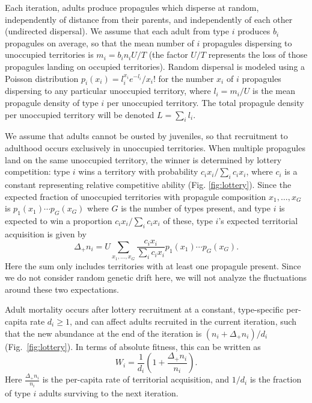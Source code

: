 \documentclass[12pt]{article}
\begin{document}
Each iteration, adults produce propagules which disperse at random, independently of distance from their parents, and independently of each other (undirected dispersal). We assume that each adult from type $i$ produces $b_i$ propagules on average, so that the mean number of $i$ propagules dispersing to unoccupied territories is $m_i=b_in_iU/T$ (the factor $U/T$ represents the loss of those propagules landing on occupied territories). Random dispersal is modeled using a Poisson distribution $p_i(x_i)=l_i^{x_i} e^{-l_i}/x_i!$ for the number $x_i$ of $i$ propagules dispersing to any particular unoccupied territory, where $l_i=m_i/U$ is the mean propagule density of type $i$ per unoccupied territory. The total propagule density per unoccupied territory will be denoted $L=\sum_i l_i$.

We assume that adults cannot be ousted by juveniles, so that recruitment to adulthood occurs exclusively in unoccupied territories. When multiple propagules land on the same unoccupied territory, the winner is determined by lottery competition: type $i$ wins a territory with probability $c_i x_i/\sum_i c_i x_i$, where $c_i$ is a constant representing relative competitive ability (Fig. \ref{fig:lottery}). Since the expected fraction of unoccupied territories with propagule composition $x_1,\ldots,x_G$ is $p_1(x_1)\cdots p_G(x_G)$ where $G$ is the number of types present, and type $i$ is expected to win a proportion $c_i x_i/\sum_i c_i x_i$ of these, type $i$'s expected territorial acquisition is given by
\begin{equation}
\Delta_+ n_i=U\sum_{x_1,\ldots,x_G} \frac{c_i x_i}{\sum_i c_i x_i} p_1(x_1)\cdots p_G(x_G). \label{eq:growthsumuncoupled}
\end{equation}
Here the sum only includes territories with at least one propagule present. Since we do not consider random genetic drift here, we will not analyze the fluctuations around these two expectations.

Adult mortality occurs after lottery recruitment at a constant, type-specific per-capita rate $d_i\geq 1$, and can affect adults recruited in the current iteration, such that the new abundance at the end of the iteration is $(n_i+\Delta_+ n_i)/d_i$ (Fig.~\ref{fig:lottery}). In terms of absolute fitness, this can be written as
\begin{equation}
W_i=\frac{1}{d_i}\left(1+\frac{\Delta_+ n_i}{n_i}\right). \label{eq:absfit}
\end{equation}
Here $\frac{\Delta_+ n_i}{n_i}$ is the per-capita rate of territorial acquisition, and $1/d_i$ is the fraction of type $i$ adults surviving to the next iteration.
\end{document}
